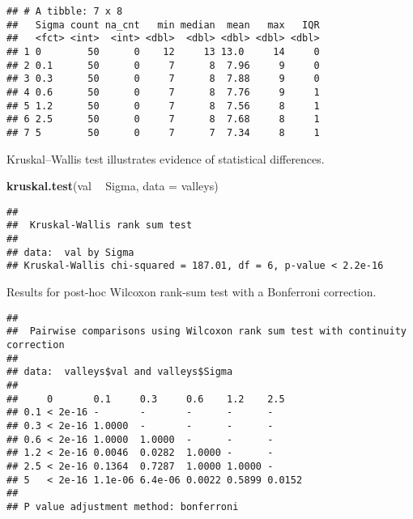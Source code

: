 \documentclass[]{book}
\newenvironment{Shaded}{\begin{snugshade}}{\end{snugshade}}
\newcommand{\DataTypeTok}[1]{\textcolor[rgb]{0.13,0.29,0.53}{#1}}
\newcommand{\KeywordTok}[1]{\textcolor[rgb]{0.13,0.29,0.53}{\textbf{#1}}}
\newcommand{\NormalTok}[1]{#1}
\newcommand{\OperatorTok}[1]{\textcolor[rgb]{0.81,0.36,0.00}{\textbf{#1}}}
\newcommand{\OtherTok}[1]{\textcolor[rgb]{0.56,0.35,0.01}{#1}}
\newcommand{\StringTok}[1]{\textcolor[rgb]{0.31,0.60,0.02}{#1}}
\begin{document}
\begin{verbatim}
## # A tibble: 7 x 8
##   Sigma count na_cnt   min median  mean   max   IQR
##   <fct> <int>  <int> <dbl>  <dbl> <dbl> <dbl> <dbl>
## 1 0        50      0    12     13 13.0     14     0
## 2 0.1      50      0     7      8  7.96     9     0
## 3 0.3      50      0     7      8  7.88     9     0
## 4 0.6      50      0     7      8  7.76     9     1
## 5 1.2      50      0     7      8  7.56     8     1
## 6 2.5      50      0     7      8  7.68     8     1
## 7 5        50      0     7      7  7.34     8     1
\end{verbatim}

Kruskal--Wallis test illustrates evidence of statistical differences.

\begin{Shaded}
\begin{Highlighting}[]
\KeywordTok{kruskal.test}\NormalTok{(val }\OperatorTok{~}\StringTok{ }\NormalTok{Sigma, }\DataTypeTok{data =}\NormalTok{ valleys)}
\end{Highlighting}
\end{Shaded}

\begin{verbatim}
## 
##  Kruskal-Wallis rank sum test
## 
## data:  val by Sigma
## Kruskal-Wallis chi-squared = 187.01, df = 6, p-value < 2.2e-16
\end{verbatim}

Results for post-hoc Wilcoxon rank-sum test with a Bonferroni correction.

\begin{Shaded}
\end{Shaded}

\begin{verbatim}
## 
##  Pairwise comparisons using Wilcoxon rank sum test with continuity correction 
## 
## data:  valleys$val and valleys$Sigma 
## 
##     0       0.1     0.3     0.6    1.2    2.5   
## 0.1 < 2e-16 -       -       -      -      -     
## 0.3 < 2e-16 1.0000  -       -      -      -     
## 0.6 < 2e-16 1.0000  1.0000  -      -      -     
## 1.2 < 2e-16 0.0046  0.0282  1.0000 -      -     
## 2.5 < 2e-16 0.1364  0.7287  1.0000 1.0000 -     
## 5   < 2e-16 1.1e-06 6.4e-06 0.0022 0.5899 0.0152
## 
## P value adjustment method: bonferroni
\end{verbatim}
\end{document}
